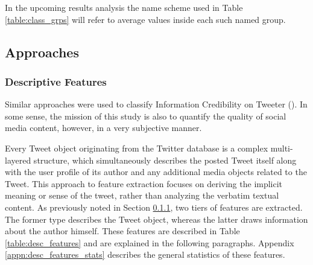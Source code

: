 		In the upcoming results analysis the name scheme used in Table \ref{table:class_grps} will refer to average values inside each such named group. 
	
	\subsection{Approaches}
		\label{section:feature_types}
		\subsubsection{Descriptive Features}
			\label{section:Descriptive_Features}
			Similar approaches were used to classify Information Credibility on Tweeter (\cite{castillo2011information}). In some sense, the mission of this study is also to quantify the quality of social media content, however, in a very subjective manner.
			\par	
		
			Every Tweet object originating from the Twitter database is a complex multi-layered structure, which  simultaneously describes the posted Tweet itself along with the user profile of its author and any additional media objects related to the Tweet. This approach to feature extraction focuses on deriving the implicit meaning or sense of the tweet, rather than analyzing the verbatim textual content. As previously noted in Section \ref{section:Descriptive_Features}, two tiers of features are extracted. The former type describes the Tweet object, whereas the latter draws information about the author himself. These features are described in Table \ref{table:desc_features} and are explained in the following paragraphs. Appendix \ref{appn:desc_features_stats} describes the general statistics of these features. 
			
